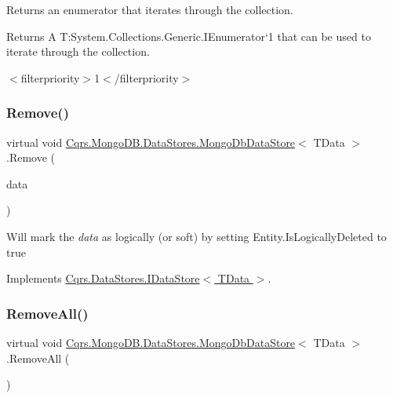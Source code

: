 Returns an enumerator that iterates through the collection. 

\begin{DoxyReturn}{Returns}
A T\+:\+System.\+Collections.\+Generic.\+I\+Enumerator`1 that can be used to iterate through the collection. 
\end{DoxyReturn}
$<$filterpriority$>$1$<$/filterpriority$>$ \mbox{\label{classCqrs_1_1MongoDB_1_1DataStores_1_1MongoDbDataStore_a14b43546e8d1e1832358e1cf2f8535f1}} 
\subsubsection{\texorpdfstring{Remove()}{Remove()}}
{\footnotesize\ttfamily virtual void \hyperlink{classCqrs_1_1MongoDB_1_1DataStores_1_1MongoDbDataStore}{Cqrs.\+Mongo\+D\+B.\+Data\+Stores.\+Mongo\+Db\+Data\+Store}$<$ T\+Data $>$.Remove (\begin{DoxyParamCaption}\item[{T\+Data}]{data }\end{DoxyParamCaption})\hspace{0.3cm}{\ttfamily [virtual]}}



Will mark the {\itshape data}  as logically (or soft) by setting Entity.\+Is\+Logically\+Deleted to true 



Implements \hyperlink{interfaceCqrs_1_1DataStores_1_1IDataStore_a7ef540796bbe4257296841590bc23478}{Cqrs.\+Data\+Stores.\+I\+Data\+Store$<$ T\+Data $>$}.

\mbox{\label{classCqrs_1_1MongoDB_1_1DataStores_1_1MongoDbDataStore_ac0cb8626e8f8ab0275a31e88a920ee3e}} 
\subsubsection{\texorpdfstring{Remove\+All()}{RemoveAll()}}
{\footnotesize\ttfamily virtual void \hyperlink{classCqrs_1_1MongoDB_1_1DataStores_1_1MongoDbDataStore}{Cqrs.\+Mongo\+D\+B.\+Data\+Stores.\+Mongo\+Db\+Data\+Store}$<$ T\+Data $>$.Remove\+All (\begin{DoxyParamCaption}{ }\end{DoxyParamCaption})\hspace{0.3cm}{\ttfamily [virtual]}}



